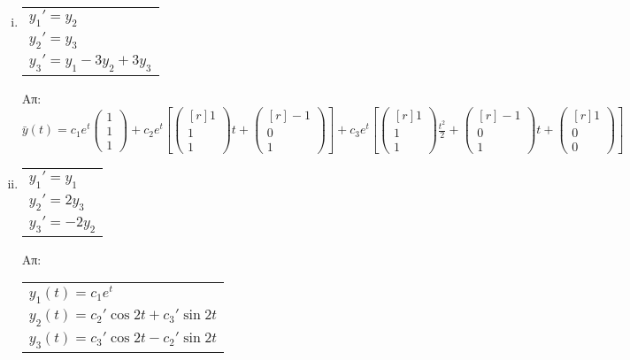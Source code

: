 \begin{enumerate}
\begin{enumerate}[i)]
\item  \begin{tabular}{l} $y_1'=y_2$ \\ $y_2'=y_3$ \\ $y_3'=y_1-3y_2+3y_3$\end{tabular} 

\hfill Απ: $\scriptstyle{\bar{y}(t)=c_1e^{t}\begin{pmatrix*}
1\\1\\1
\end{pmatrix*}+c_2e^{t}\left[\begin{pmatrix*}[r]
1\\1\\1
\end{pmatrix*}t+\begin{pmatrix*}[r]
-1\\0\\1
\end{pmatrix*}\right]+c_3e^{t}\left[\begin{pmatrix*}[r]
1\\1\\1
\end{pmatrix*}\frac{t^2}{2}+\begin{pmatrix*}[r]
-1\\0\\1
\end{pmatrix*}t+\begin{pmatrix*}[r]
1\\0\\0
\end{pmatrix*}\right]}$

\item  \begin{tabular}{l} $y_1'=y_1$ \\ $y_2'=2y_3$ \\ $y_3'=-2y_2$\end{tabular}\hfill Απ: \begin{tabular}{l}
$y_1(t)=c_1e^t$ \\
$y_2(t)=c_2'\cos 2t+c_3'\sin 2t$ \\
$y_3(t)=c_3'\cos 2t-c_2'\sin 2t$
\end{tabular}

\end{enumerate}



\end{enumerate}


